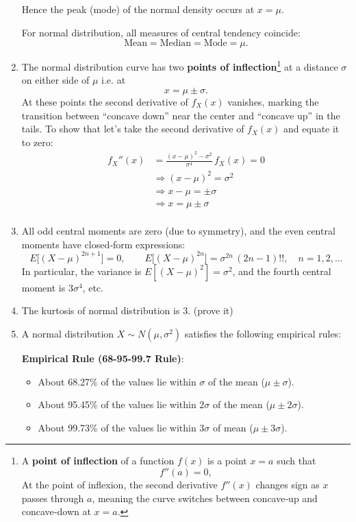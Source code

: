 \documentclass[twoside]{book}
\begin{document}
\begin{enumerate}
  Hence the peak (mode) of the normal density occurs at \(x=\mu\).
  \begin{textbox}
  For normal distribution, all measures of central tendency coincide:
      \[
        \text{Mean} = \text{Median} = \text{Mode} = \mu.
      \]
  \end{textbox}


  \item The normal distribution curve has two \textbf{points of inflection}\footnote{A \textbf{point of inflection} of a function $f(x)$ is a point $x = a$ such that
  \[
  f''(a) = 0,
  \]
  At the point of inflexion, the second derivative $f''(x)$ changes sign as $x$ passes through $a$, meaning the curve switches between concave‐up and concave‐down at $x = a$.} at a distance $\sigma$ on either side of $\mu$ i.e. at
    \[
      x = \mu \pm \sigma.
    \]
    At these points the second derivative of \(f_X(x)\) vanishes, marking the transition between “concave down” near the center and “concave up” in the tails. To show that let's take the second derivative of $f_X(x)$ and equate it to zero:
   \begin{align*}
   f_X''(x) &= \frac{(x-\mu)^2 - \sigma^2}{\sigma^4}\,f_X(x) = 0 \\
   &\Rightarrow (x-\mu)^2 = \sigma^2 \\
   &\Rightarrow x-\mu = \pm\sigma \\
   &\Rightarrow x = \mu \pm\sigma \\
   \end{align*}

  \item All odd central moments are zero (due to symmetry), and the even central moments have closed‐form expressions:
    \[
      E\bigl[(X-\mu)^{2n+1}\bigr] = 0,
      \qquad
      E\bigl[(X-\mu)^{2n}\bigr] = \sigma^{2n}\,(2n - 1)!!,
      \quad n = 1,2,\dots
    \]
    In particular, the variance is \(E[(X-\mu)^2]=\sigma^2\), and the fourth central moment is \(3\sigma^4\), etc.

   \item The kurtosis of normal distribution is 3. (prove it)

  \item A normal distribution \(X\sim N(\mu,\sigma^2)\) satisfies the following empirical rules:

  \begin{textbox}
  \textbf{Empirical Rule (68-95-99.7 Rule)}:
    \begin{itemize}
        \item About 68.27\% of the values lie within $\sigma$ of the mean ($\mu \pm \sigma$).
        \item About 95.45\% of the values lie within $2\sigma$ of the mean ($\mu \pm 2\sigma$).
        \item About 99.73\% of the values lie within $3\sigma$ of mean ($\mu \pm 3\sigma$).
    \end{itemize}
  \end{textbox}


\end{enumerate}
\end{document}
